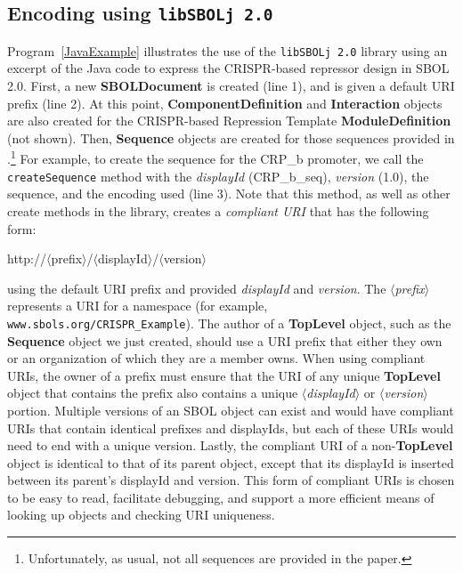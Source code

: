 \subsection*{Encoding using {\tt libSBOLj 2.0}}
Program~\ref{JavaExample} illustrates the use of the {\tt libSBOLj 2.0} library using an excerpt of the Java code to express the CRISPR-based repressor design in SBOL 2.0. First, a new \textbf{SBOLDocument} is created (line 1), and is given a default URI prefix (line 2). At this point, \textbf{ComponentDefinition} and \textbf{Interaction} objects are also created for the CRISPR-based Repression Template \textbf{ModuleDefinition} (not shown).  Then, \textbf{Sequence} objects are created for those sequences provided in \cite{kiani2014crispr}.\footnote{Unfortunately, as usual, not all sequences are provided in the paper.} For example, to create the sequence for the CRP\_b promoter, we call the {\tt createSequence} method with the \emph{displayId} (CRP\_b\_seq), \emph{version} (1.0), the sequence, and the encoding used (line 3).  
Note that this method, as well as other create methods in the library, creates a \emph{compliant URI} that has the following form:
\begin{center}
http://$\langle$prefix$\rangle$/$\langle$displayId$\rangle$/$\langle$version$\rangle$
\end{center}
using the default URI prefix and provided \emph{displayId} and \emph{version}. The \emph{$\langle$prefix$\rangle$} represents a URI for a namespace (for example, {\tt www.sbols.org/CRISPR\_Example}). The author of a \textbf{TopLevel} object, such as the \textbf{Sequence} object we just created, should use a URI prefix that either they own or an organization of which they are a member owns. When using compliant URIs, the owner of a prefix must ensure that the URI of any unique \textbf{TopLevel} object that contains the prefix also contains a unique  \emph{$\langle$displayId$\rangle$} or \emph{$\langle$version$\rangle$} portion. Multiple versions of an SBOL object can exist and would have compliant URIs that contain identical prefixes and displayIds, but each of these URIs would need to end with a unique version. Lastly, the compliant URI of a non-\textbf{TopLevel} object is identical to that of its parent object, except that its displayId is inserted between its parent's displayId and version. This form of compliant URIs is chosen to be easy to read, facilitate debugging, and support a more efficient means of looking up objects and checking URI uniqueness. 

